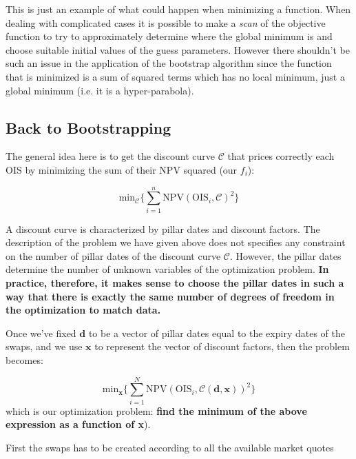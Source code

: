 This is just an example of what could happen when minimizing a function. When dealing with complicated cases it is possible to make a \emph{scan} of the objective function to try to approximately determine where the global minimum is and choose suitable initial values of the guess parameters.
However there shouldn't be such an issue in the application of the bootstrap algorithm since the function that is minimized is a sum of squared terms which has no local minimum, just a global minimum (i.e. it is a hyper-parabola).

\subsection{Back to Bootstrapping}
\label{ois-example}
The general idea here is to get the discount curve \(\mathcal{C}\) that prices correctly each OIS by minimizing the sum of their NPV squared (our \(f_i\)):

\begin{equation}
\mathrm{min}_{\mathcal{C}} \Big\{\sum_{i=1}^{n}\mathrm{NPV}(\mathrm{OIS}_i, \mathcal{C})^2\Big\}
\end{equation}

A discount curve is characterized by pillar dates and discount factors. The description of the problem we have given above does not specifies any constraint on the number of pillar dates of the discount curve \(\mathcal{C}\). However, the pillar dates determine the number of unknown variables of the optimization problem.  \textbf{In practice, therefore, it makes sense to choose the pillar dates in such a way that there is exactly the same number of degrees of freedom in the optimization to match data.} 

Once we've fixed \(\mathbf{d}\) to be a vector of pillar dates equal to the expiry dates of the swaps, and we use \(\mathbf{x}\) to represent the vector of discount factors, then the problem becomes:

\begin{equation}
\mathrm{min}_{\mathbf{x}} \Big\{\sum_{i=1}^{N}\mathrm{NPV}(\mathrm{OIS}_i, \mathcal{C}(\mathbf{d}, \mathbf{x}))^2\Big\}
\end{equation}
which is our optimization problem: \textbf{find the minimum of the above expression as a function of x}).

First the swaps has to be created according to all the available market quotes

